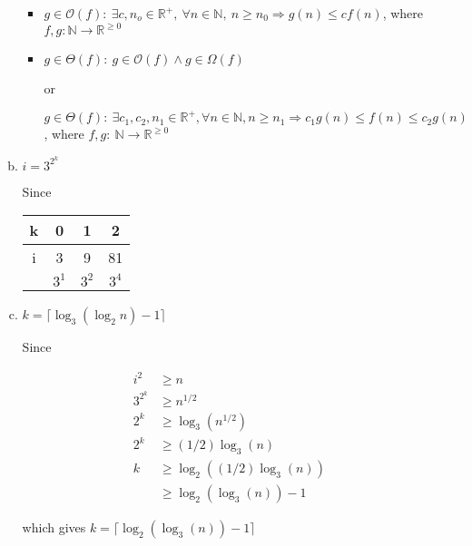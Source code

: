 \documentclass[12pt]{article}
\begin{document}
\begin{enumerate}[1.]
\begin{enumerate}[a)]
\begin{itemize}
            \item

            $g \in \mathcal{O}(f):\:\exists c,n_o \in \mathbb{R}^{+},\:\forall n \in
            \mathbb{N},\:n \geq n_0 \Rightarrow g(n) \leq cf(n)$, where $f,g:\mathbb{N} \to \mathbb{R}^{\geq 0}$

            \item

            $g \in \Theta(f):\: g \in \mathcal{O}(f) \land g \in \Omega(f)$

            or

            $g \in \Theta(f):\:\exists c_1,c_2,n_1 \in \mathbb{R}^{+}, \forall n \in \mathbb{N}, n \geq n_1
            \Rightarrow c_1g(n) \leq f(n) \leq c_2g(n)$, where $f,g:\:\mathbb{N} \to \mathbb{R}^{\geq 0}$
        \end{itemize}

        \item $i = 3^{2^k}$

        \bigskip

        Since

        \bigskip

        \begin{tabular}{|c|c|c|c|}
            \hline
            k & 0 & 1 & 2\\
            \hline
            i & 3 & 9 & 81\\
            \hline
            & $3^1$ & $3^2$ & $3^4$\\
            \hline
        \end{tabular}

        \item $k = \lceil \log_3(\log_2 n) - 1\rceil$
        \setcounter{equation}{0}
        \bigskip

        Since

        \begin{align}
            i^2 &\geq n\\
            3^{2^k} &\geq n^{1/2}\\
            2^k &\geq \log_3(n^{1/2})\\
            2^k &\geq (1/2)\log_3(n)\\
            k &\geq \log_2((1/2)\log_3(n))\\
            &\geq \log_2(\log_3(n)) - 1
        \end{align}

        \bigskip

        which gives $k = \lceil \log_2(\log_3(n)) - 1 \rceil$


\end{enumerate}
\end{enumerate}
\end{document}
